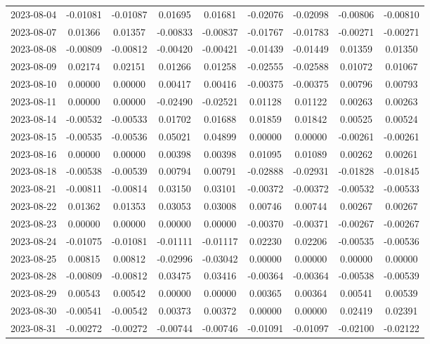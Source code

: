 \begin{footnotesize}
\begin{longtable}{lcccccccc}
2023-08-04 & -0.01081 & -0.01087 & 0.01695 & 0.01681 & -0.02076 & -0.02098 & -0.00806 & -0.00810 \\
2023-08-07 & 0.01366 & 0.01357 & -0.00833 & -0.00837 & -0.01767 & -0.01783 & -0.00271 & -0.00271 \\
2023-08-08 & -0.00809 & -0.00812 & -0.00420 & -0.00421 & -0.01439 & -0.01449 & 0.01359 & 0.01350 \\
2023-08-09 & 0.02174 & 0.02151 & 0.01266 & 0.01258 & -0.02555 & -0.02588 & 0.01072 & 0.01067 \\
2023-08-10 & 0.00000 & 0.00000 & 0.00417 & 0.00416 & -0.00375 & -0.00375 & 0.00796 & 0.00793 \\
2023-08-11 & 0.00000 & 0.00000 & -0.02490 & -0.02521 & 0.01128 & 0.01122 & 0.00263 & 0.00263 \\
2023-08-14 & -0.00532 & -0.00533 & 0.01702 & 0.01688 & 0.01859 & 0.01842 & 0.00525 & 0.00524 \\
2023-08-15 & -0.00535 & -0.00536 & 0.05021 & 0.04899 & 0.00000 & 0.00000 & -0.00261 & -0.00261 \\
2023-08-16 & 0.00000 & 0.00000 & 0.00398 & 0.00398 & 0.01095 & 0.01089 & 0.00262 & 0.00261 \\
2023-08-18 & -0.00538 & -0.00539 & 0.00794 & 0.00791 & -0.02888 & -0.02931 & -0.01828 & -0.01845 \\
2023-08-21 & -0.00811 & -0.00814 & 0.03150 & 0.03101 & -0.00372 & -0.00372 & -0.00532 & -0.00533 \\
2023-08-22 & 0.01362 & 0.01353 & 0.03053 & 0.03008 & 0.00746 & 0.00744 & 0.00267 & 0.00267 \\
2023-08-23 & 0.00000 & 0.00000 & 0.00000 & 0.00000 & -0.00370 & -0.00371 & -0.00267 & -0.00267 \\
2023-08-24 & -0.01075 & -0.01081 & -0.01111 & -0.01117 & 0.02230 & 0.02206 & -0.00535 & -0.00536 \\
2023-08-25 & 0.00815 & 0.00812 & -0.02996 & -0.03042 & 0.00000 & 0.00000 & 0.00000 & 0.00000 \\
2023-08-28 & -0.00809 & -0.00812 & 0.03475 & 0.03416 & -0.00364 & -0.00364 & -0.00538 & -0.00539 \\
2023-08-29 & 0.00543 & 0.00542 & 0.00000 & 0.00000 & 0.00365 & 0.00364 & 0.00541 & 0.00539 \\
2023-08-30 & -0.00541 & -0.00542 & 0.00373 & 0.00372 & 0.00000 & 0.00000 & 0.02419 & 0.02391 \\
2023-08-31 & -0.00272 & -0.00272 & -0.00744 & -0.00746 & -0.01091 & -0.01097 & -0.02100 & -0.02122 \\

\end{longtable}
\end{footnotesize}
